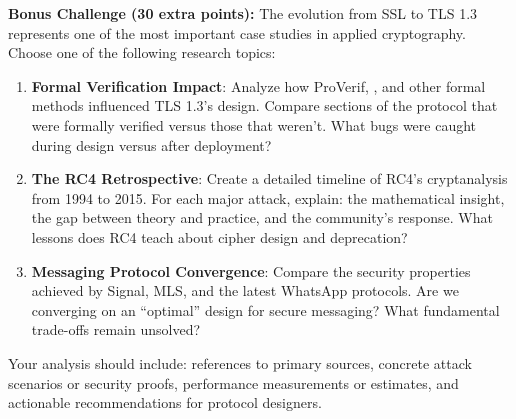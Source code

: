 \documentclass[10pt,a4paper,american]{article}
\begin{document}
\begin{tcolorbox}[colframe=EarthBrown!30!white,colback=EarthBrown!5!white]
	\textbf{Bonus Challenge (30 extra points):} The evolution from SSL to TLS 1.3 represents one of the most important case studies in applied cryptography. Choose one of the following research topics:
	\begin{enumerate}
		\item \textbf{Formal Verification Impact}: Analyze how ProVerif, \fstar, and other formal methods influenced TLS 1.3's design. Compare sections of the protocol that were formally verified versus those that weren't. What bugs were caught during design versus after deployment?
		\item \textbf{The RC4 Retrospective}: Create a detailed timeline of RC4's cryptanalysis from 1994 to 2015. For each major attack, explain: the mathematical insight, the gap between theory and practice, and the community's response. What lessons does RC4 teach about cipher design and deprecation?
		\item \textbf{Messaging Protocol Convergence}: Compare the security properties achieved by Signal, MLS, and the latest WhatsApp protocols. Are we converging on an ``optimal'' design for secure messaging? What fundamental trade-offs remain unsolved?
	\end{enumerate}
	Your analysis should include: references to primary sources, concrete attack scenarios or security proofs, performance measurements or estimates, and actionable recommendations for protocol designers.
\end{tcolorbox}
\end{document}
